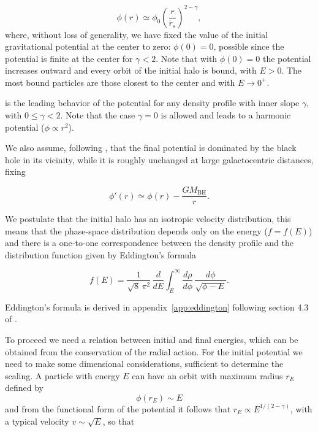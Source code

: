 \begin{equation} \label{eq:phipl}
\phi(r) \simeq \phi_0 \left( \frac{r}{r_s} \right)^{2-\gamma},
\end{equation}
where, without loss of generality, we have fixed the value of the initial gravitational potential at the center to zero:
$\phi(0)=0$, possible since the potential is finite at the center for $\gamma<2$.
Note that with $\phi(0)=0$ the potential increases outward and every orbit of the
initial halo is bound, with $E > 0$. The most bound particles
are those closest to the center and
with $E \to 0^{+}$.

 is the leading behavior of the potential for any density profile with inner slope
$\gamma$, with $0 \le \gamma < 2$. Note that the case $\gamma = 0$ is allowed
and leads to a harmonic potential ($\phi \propto r^2$).

We also assume, following \cite{Ullio_2001}, that the final potential is dominated by the black hole in its vicinity,
while it is roughly unchanged at large galactocentric distances, fixing

\begin{equation}
\phi'(r) \simeq \phi(r) - \frac{GM_{\mathrm{BH}}}{r}.
\end{equation}


We postulate that the initial halo has an isotropic velocity distribution, 
this means that the phase-space distribution depends only on the energy ($f=f(E)$) 
and there is a one-to-one correspondence between the density profile and the
distribution function given by Eddington's formula \cite{BinneyTremaine2008,Ullio_2001}

\begin{equation} \label{eq:eddington}
f(E)
=
\frac{1}{\sqrt{8}\,\pi^{2}}\,
\frac{d}{dE}
\int_{E}^{\infty}
\frac{d\rho}{d\phi}\,
\frac{d\phi}{\sqrt{\phi-E}}.
\end{equation}

Eddington's formula is derived in appendix~\ref{app:eddington} following section 4.3 of \cite{BinneyTremaine2008}.

To proceed we need a relation between initial and final
energies, which can be obtained from the conservation of the radial action.
For the initial potential we need to make some dimensional considerations,
sufficient to determine the scaling. A particle with energy $E$ can have 
an orbit with maximum radius $r_E$ defined by
\begin{equation}
    \phi(r_E) \sim E
\end{equation}
and from the functional form of the potential it follows that
$r_E \propto E^{1/(2-\gamma)}$, with a typical
velocity $v \sim \sqrt{E}$, so that


